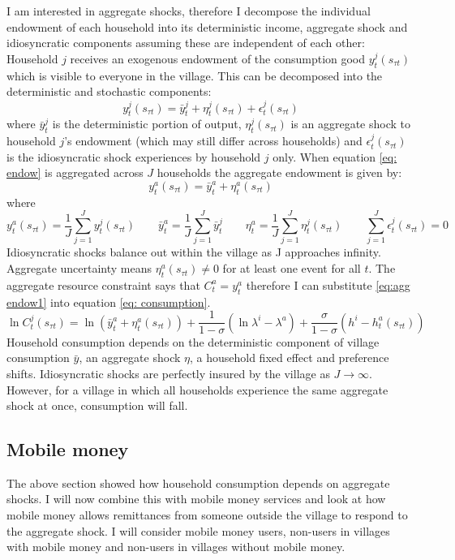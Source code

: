I am interested in aggregate shocks, therefore I decompose the individual endowment of each household into its deterministic income, aggregate shock and idiosyncratic components assuming these are independent of each other:
Household $j$ receives an exogenous endowment of the consumption good $y^j_t(s_{\tau t})$ which is visible to everyone in the village. This can be decomposed into the deterministic and stochastic components: 
\begin{equation} \label{eq: endow}
y^j_t(s_{\tau t}) = \bar{y}^j_t + \eta_t^j(s_{\tau t}) + \epsilon_t^j(s_{\tau t})
\end{equation}
where $\bar{y}^j_t$ is the deterministic portion of output, $\eta_t^j(s_{\tau t})$ is an aggregate shock to household $j$'s endowment (which may still differ across households) and $\epsilon_t^j(s_{\tau t})$ is the idiosyncratic shock experiences by household $j$ only. When equation \eqref{eq: endow} is aggregated across $J$ households the aggregate endowment is given by:
\begin{equation} \label{eq:agg endow1}
y^a_t(s_{\tau t}) = \bar{y}^a_t + \eta_t^a(s_{\tau t})
\end{equation}
where 
\[
y^a_t(s_{\tau t})= \frac{1}{J}\sum_{j=1}^Jy^j_t(s_{\tau t}) \qquad \bar{y}^a_t= \frac{1}{J}\sum_{j=1}^J \bar{y}^j_t \qquad  \eta^a_t=\frac{1}{J}\sum_{j=1}^J\eta_t^j(s_{\tau t}) \qquad \sum_{j=1}^J \epsilon_t^j(s_{\tau t})=0
\]
Idiosyncratic shocks balance out within the village as J approaches infinity. Aggregate uncertainty means $\eta_t^a(s_{\tau t}) \neq 0$ for at least one event for all $t$. The aggregate resource constraint says that $C^a_t=y^a_t$ therefore I can substitute \eqref{eq:agg endow1} into equation \eqref{eq: consumption}. 
\begin{equation} \label{eq: agg shock}
\ln C_t^j(s_{\tau t}) = \ln (\bar{y}^a_t + \eta_t^a(s_{\tau t})) + \frac{1}{1-\sigma}(\ln \lambda^i- \lambda^a) + \frac{\sigma}{1-\sigma}(h^i- h^a_t(s_{\tau t}))
\end{equation}
Household consumption depends on the deterministic component of village consumption $\bar{y}$, an aggregate shock $\eta$, a household fixed effect and preference shifts. Idiosyncratic shocks are perfectly insured by the village as $J \rightarrow \infty$. However, for a village in which all households experience the same aggregate shock at once, consumption will fall. 

\subsection{Mobile money}
The above section showed how household consumption depends on aggregate shocks. I will now combine this with mobile money services and look at how mobile money allows remittances from someone outside the village to respond to the aggregate shock. I will consider mobile money users, non-users in villages with mobile money and non-users in villages without mobile money. 

